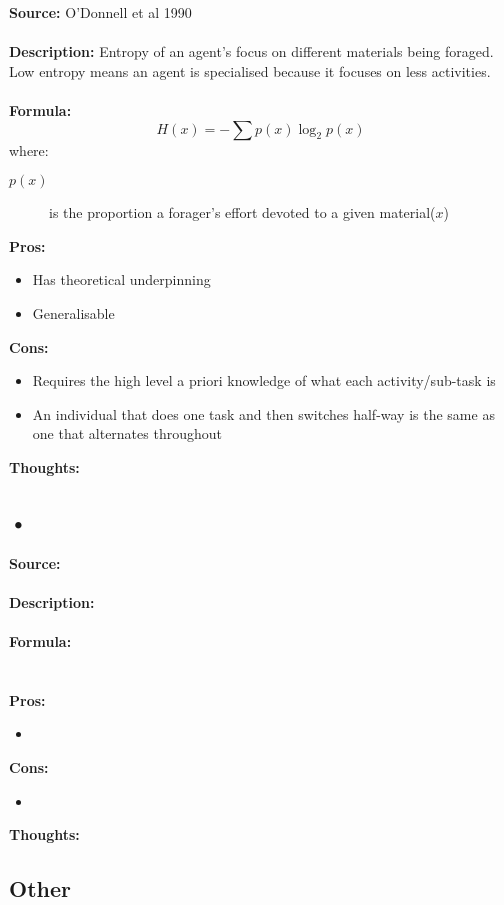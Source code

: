 \documentclass[12pt]{article}
\begin{document}
\textbf{Source: }O'Donnell et al 1990 \cite{odonnell:BES:1990} \\\\
\textbf{Description: }Entropy of an agent's focus on different materials being foraged. Low entropy means an agent is specialised because it focuses on less activities.\\\\
\textbf{Formula: }\\
%
\[
H(x)=- \sum  p(x)\log_{2}p(x)
\]
%
where:
\begin{description}
\item[$p(x)$] is the proportion a forager's effort devoted to a given material($x$)
\end{description}
\textbf{Pros:}
\begin{itemize}
\item Has theoretical underpinning
\item Generalisable
\end{itemize}
\textbf{Cons:}
\begin{itemize}
\item Requires the high level a priori knowledge of what each activity/sub-task is
\item An individual that does one task and then switches half-way is the same as one that alternates throughout
\end{itemize}
\textbf{Thoughts:}\\

\subsection{•}

\textbf{Source: } \\\\
\textbf{Description: } \\\\
\textbf{Formula: }\\
%
%
\\\\
\textbf{Pros:}
\begin{itemize}
\item 
\end{itemize}
\textbf{Cons:}
\begin{itemize}
\item 
\end{itemize}
\textbf{Thoughts:}\\

\subsection{Other}
\end{document}
